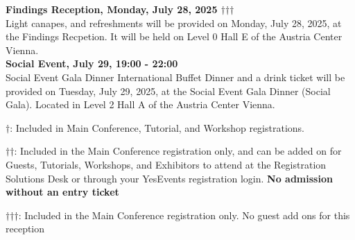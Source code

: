 \newpage
\textbf{Findings Reception, Monday, July 28, 2025 $\dagger$$\dagger$$\dagger$}\\

Light canapes, and refreshments will be provided on Monday, July 28, 2025, at the Findings Recpetion.  It will be held on Level 0 Hall E of the Austria Center Vienna.\\

\textbf{Social Event, July 29, 19:00 - 22:00}\\

Social Event Gala Dinner International Buffet Dinner and a drink ticket will be provided on Tuesday, July 29, 2025, at the Social Event Gala Dinner (Social Gala). Located in Level 2 Hall A of the Austria Center Vienna.

\vspace{4em}

$\dagger$: Included in Main Conference, Tutorial, and Workshop registrations.

$\dagger$$\dagger$: Included in the Main Conference registration only, and can be added on for Guests, Tutorials, Workshops, and Exhibitors to attend at the Registration Solutions Desk or through your YesEvents registration login. \textbf{No admission without an entry ticket}

$\dagger$$\dagger$$\dagger$: Included in the Main Conference registration only. No guest add ons for this reception
